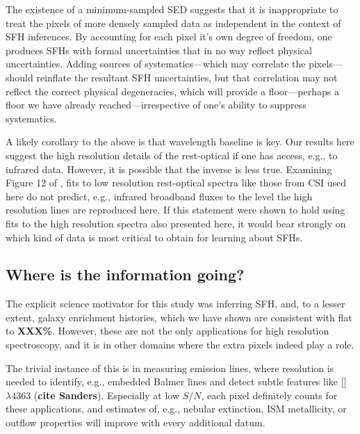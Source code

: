 \documentclass[a4paper,fleqn,usenatbib]{mnras}
\newcommand{\bfr}{\bf\color{red}}
\begin{document}
The existence of a minimum-sampled SED suggests that it is inappropriate to treat the pixels 
of more densely sampled data as independent in the context of SFH inferences. By accounting for each 
pixel it's own degree of freedom, one produces SFHs with formal uncertainties that in
no way reflect physical uncertainties. Adding sources of systematics---which may correlate
the pixels---should reinflate the resultant SFH uncertainties, but that correlation may not reflect
the correct physical degeneracies, which will provide a floor---perhaps a floor we have already 
reached---irrespective of one's ability to suppress systematics.

A likely corollary to the above is that wavelength baseline is key. Our results here suggest
the high resolution details of the rest-optical if one has access, e.g., to infrared data. However,
it is possible that the inverse is less true. Examining Figure 12 of \citet{Abramson20}, fits to
low resolution rest-optical spectra like those from CSI used here do not predict, e.g., infrared
broadband fluxes to the level the high resolution lines are reproduced here. If this statement
were shown to hold using fits to the high resolution spectra also presented here, it would bear
strongly on which kind of data is most critical to obtain for learning about SFHs. 

\subsection{Where is the information going?}
\label{sec:redshifts}

The explicit science motivator for this study was inferring SFH, and, to a lesser extent, galaxy 
enrichment histories, which we have shown are consistent with flat to {\bfr XXX\%}. However, 
these are not the only applications for high resolution spectroscopy, and it is in other domains 
where the extra pixels indeed play a role.

The trivial instance of this is in measuring emission lines, where resolution is needed to 
identify, e.g., embedded Balmer lines and detect subtle features like [] 
$\lambda4363$ ({\bfr cite Sanders}). Especially at low $S/N$, each pixel definitely counts
for these applications, and estimates of, e.g., nebular extinction, ISM metallicity, or outflow
properties will improve with every additional datum.
\end{document}
